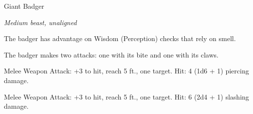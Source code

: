 \begin{monsterbox}{Giant Badger}
\begin{hangingpar}
\textit{Medium beast, unaligned}
\end{hangingpar}
\dndline%
\basics[%
armorclass = 10,
hitpoints = 2d8 + 4,
speed = {30 ft., burrow 10 ft.}
]
\dndline%
\stats[%
STR = \stat{13},
DEX = \stat{10},
CON = \stat{15},
INT = \stat{2},
WIS = \stat{12},
CHA = \stat{5}
]
\dndline%
\details[%
skills={},
damageimmunities={},
savingthrows={},
conditionimmunities={},
damageresistances={},
damagevulnerabilities={},
senses={darkvision 30 ft., passive Perception 11},
challenge=1/4
]
\dndline%
\begin{monsteraction}
The badger has advantage on Wisdom (Perception) checks that rely on smell.
\end{monsteraction}
\begin{monsteraction}[Multiattack]
The badger makes two attacks: one with its bite and one with its claws.
\end{monsteraction}
\begin{monsteraction}[Bite]
Melee Weapon Attack: +3 to hit, reach 5 ft., one target. Hit: 4 (1d6 + 1) piercing damage.
\end{monsteraction}
\begin{monsteraction}[Claws]
Melee Weapon Attack: +3 to hit, reach 5 ft., one target. Hit: 6 (2d4 + 1) slashing damage.
\end{monsteraction}
\end{monsterbox}